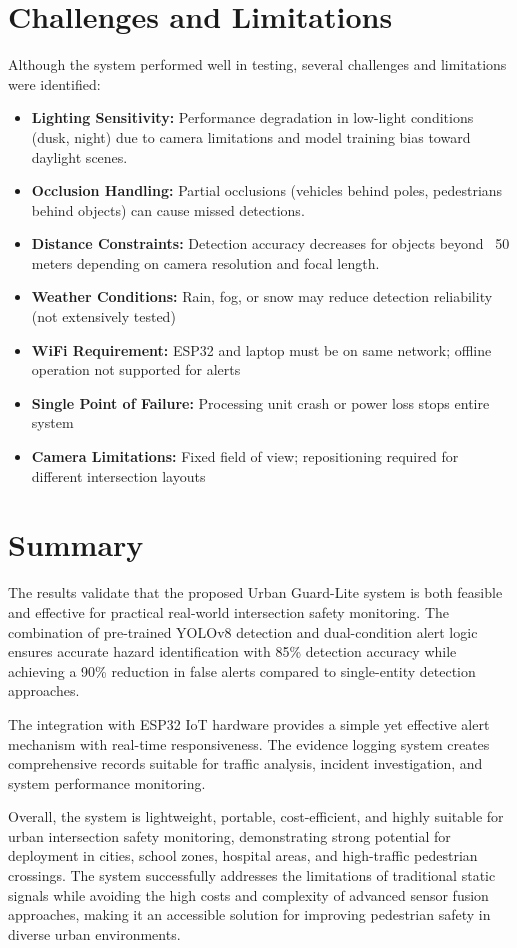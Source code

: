 \documentclass[a4paper, 12pt]{report}
\begin{document}
\section{Challenges and Limitations}
Although the system performed well in testing, several challenges and limitations were identified:
\begin{itemize}[itemsep=-4pt]
    \item \textbf{Lighting Sensitivity:} Performance degradation in low-light conditions (dusk, night) due to camera limitations and model training bias toward daylight scenes.  
    \item \textbf{Occlusion Handling:} Partial occlusions (vehicles behind poles, pedestrians behind objects) can cause missed detections.  
    \item \textbf{Distance Constraints:} Detection accuracy decreases for objects beyond ~50 meters depending on camera resolution and focal length. 
    \item \textbf{Weather Conditions:} Rain, fog, or snow may reduce detection reliability (not extensively tested)
    \item \textbf{WiFi Requirement:} ESP32 and laptop must be on same network; offline operation not supported for alerts
    \item \textbf{Single Point of Failure:} Processing unit crash or power loss stops entire system
    \item \textbf{Camera Limitations:} Fixed field of view; repositioning required for different intersection layouts
\end{itemize}

\section{Summary}
The results validate that the proposed Urban Guard-Lite system is both feasible and effective for practical real-world intersection safety monitoring. The combination of pre-trained YOLOv8 detection and dual-condition alert logic ensures accurate hazard identification with 85\% detection accuracy while achieving a 90\% reduction in false alerts compared to single-entity detection approaches.

The integration with ESP32 IoT hardware provides a simple yet effective alert mechanism with real-time responsiveness. The evidence logging system creates comprehensive records suitable for traffic analysis, incident investigation, and system performance monitoring.

Overall, the system is lightweight, portable, cost-efficient, and highly suitable for urban intersection safety monitoring, demonstrating strong potential for deployment in cities, school zones, hospital areas, and high-traffic pedestrian crossings. The system successfully addresses the limitations of traditional static signals while avoiding the high costs and complexity of advanced sensor fusion approaches, making it an accessible solution for improving pedestrian safety in diverse urban environments.
\end{document}
